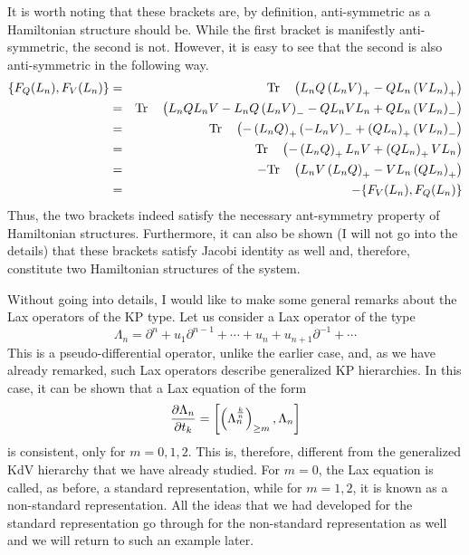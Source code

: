 \documentclass[a4paper,11pt]{article}
\begin{document}
It is worth noting that these brackets are, by definition,
anti-symmetric as a Hamiltonian structure should be. While the first
bracket is manifestly anti-symmetric, the second is not. However, it
is easy to see that the second is also anti-symmetric in the following
way.
\begin{eqnarray}
\{F_{Q}(L_{n}) , F_{V}(L_{n})\} & = & {\rm Tr}\quad
\left(L_{n}Q\left(L_{n}V\right)_{+} -
QL_{n}\left(VL_{n}\right)_{+}\right)\nonumber\\
 & = & {\rm Tr}\quad \left(L_{n}QL_{n}V -
L_{n}Q\left(L_{n}V\right)_{-} - QL_{n}VL_{n} +
QL_{n}\left(VL_{n}\right)_{-}\right)\nonumber\\
 & = & {\rm Tr}\quad
\left(-\left(L_{n}Q\right)_{+}\left(- L_{n}V\right)_{-} +
\left(QL_{n}\right)_{+}\left(VL_{n}\right)_{-}\right)\nonumber\\
 & = & {\rm Tr}\quad \left(-\left(L_{n}Q\right)_{+}L_{n}V +
\left(QL_{n}\right)_{+}VL_{n}\right)\nonumber\\
 & = & - {\rm Tr}\quad \left(L_{n}V\left(L_{n}Q\right)_{+} -
VL_{n}\left(QL_{n}\right)_{+}\right)\nonumber\\
 & = & - \{F_{V}(L_{n}) , F_{Q}(L_{n})\}
\end{eqnarray}
Thus, the two brackets indeed satisfy the necessary ant-symmetry
property of Hamiltonian structures. Furthermore, it can also be shown
(I will not go into the details) that these brackets satisfy Jacobi
identity as well and, therefore, constitute two Hamiltonian structures
of the system.

Without going into details, I would like to make some general remarks
about the Lax operators of the KP type. Let us consider a Lax operator
of the type
\begin{equation}
\Lambda_{n} = \partial^{n} + u_{1} \partial^{n-1} + \cdots + u_{n} +
u_{n+1} \partial^{-1} + \cdots
\end{equation}
This is a pseudo-differential operator, unlike the earlier case, and,
as we have already remarked, such Lax operators describe generalized
KP hierarchies. In this case, it can be shown that a Lax equation of the form
\begin{equation}
{\partial \Lambda_{n}\over \partial t_{k}} =
\left[\left(\Lambda_{n}^{k\over n}\right)_{\geq m} ,
\Lambda_{n}\right]
\end{equation}
is consistent, only for $m=0,1,2$. This is, therefore, different from
the generalized KdV hierarchy that we have already studied. For $m
=0$, the Lax equation is called, as before, a standard representation,
while for $m=1,2$, it is known as a non-standard representation. All
the ideas that we had developed for the standard representation go
through for the non-standard representation as well and we will return
to such an example later.
\end{document}
